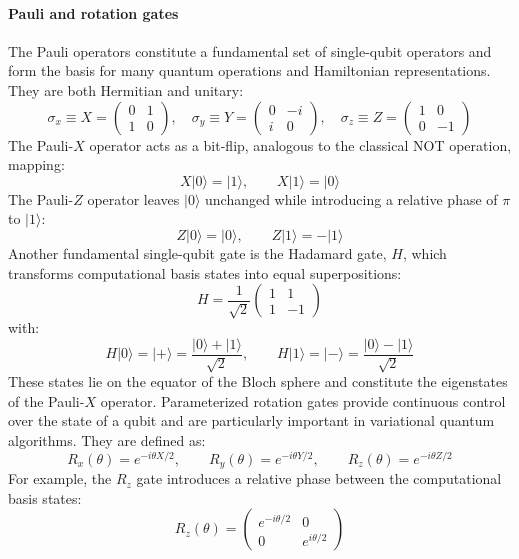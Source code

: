 \paragraph{Pauli and rotation gates}
The Pauli operators constitute a fundamental set of single-qubit operators and form the basis for many quantum operations and Hamiltonian representations. They are both Hermitian and unitary:
\begin{equation}
\sigma_x \equiv X = \begin{pmatrix} 0 & 1 \\ 1 & 0 \end{pmatrix}, \quad 
\sigma_y \equiv Y = \begin{pmatrix} 0 & -i \\ i & 0 \end{pmatrix}, \quad 
\sigma_z \equiv Z = \begin{pmatrix} 1 & 0 \\ 0 & -1 \end{pmatrix}
\end{equation}
The Pauli-$X$ operator acts as a bit-flip, analogous to the classical NOT operation, mapping:
\begin{equation}
X|0\rangle=|1\rangle,
\qquad
X|1\rangle=|0\rangle
\end{equation}
The Pauli-$Z$ operator leaves $|0\rangle$ unchanged while introducing a relative phase of $\pi$ to $|1\rangle$:
\begin{equation}
Z|0\rangle=|0\rangle,
\qquad
Z|1\rangle=-|1\rangle
\end{equation}
Another fundamental single-qubit gate is the Hadamard gate, $H$, which transforms computational basis states into equal superpositions:
\begin{equation}
H=\frac{1}{\sqrt{2}}
\begin{pmatrix}
1&1\\
1&-1
\end{pmatrix}
\end{equation}
with:
\begin{equation}
H|0\rangle=|+\rangle=
\frac{|0\rangle+|1\rangle}{\sqrt{2}},
\qquad
H|1\rangle=|-\rangle=
\frac{|0\rangle-|1\rangle}{\sqrt{2}}
\end{equation}
These states lie on the equator of the Bloch sphere and constitute the eigenstates of the Pauli-$X$ operator.
Parameterized rotation gates provide continuous control over the state of a qubit and are particularly important in variational quantum algorithms. They are defined as:
\begin{equation}
R_x(\theta)=e^{-i\theta X/2},
\qquad
R_y(\theta)=e^{-i\theta Y/2},
\qquad
R_z(\theta)=e^{-i\theta Z/2}
\end{equation}
For example, the $R_z$ gate introduces a relative phase between the computational basis states:
\begin{equation}
R_z(\theta)=
\begin{pmatrix}
e^{-i\theta/2}&0\\
0&e^{i\theta/2}
\end{pmatrix}
\end{equation}
